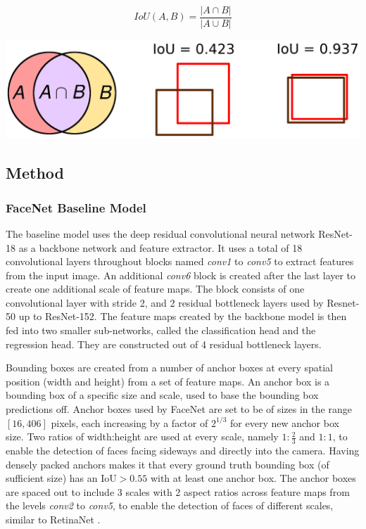 \documentclass[paperwidth=48in,paperheight=48in, fontscale=0.4166666666666, landscape]{baposter}
\begin{document}
\begin{poster}
{\begin{equation}\label{eqiou}
IoU(A, B)=\frac{|A \cap B|}{|A \cup B|}
\end{equation}


\begin{center}
   \includegraphics[scale=0.7]{iou.png}
    \label{figiou}
\end{center}

\subsection{Method}
\subsubsection{FaceNet Baseline Model}
The baseline model uses the deep residual convolutional neural network ResNet-18 \cite{resnet} as a backbone network and feature extractor. It uses a total of 18 convolutional layers throughout blocks named \textit{conv1} to \textit{conv5} to extract features from the input image. An additional \textit{conv6} block is created after the last layer to create one additional scale of feature maps. The block consists of one convolutional layer with stride 2, and 2 residual bottleneck layers used by Resnet-50 up to ResNet-152. The feature maps created by the backbone model is then fed into two smaller sub-networks, called the classification head and the regression head. They are constructed out of 4 residual bottleneck layers.

Bounding boxes are created from a number of anchor boxes at every spatial position (width and height) from a set of feature maps. An anchor box is a bounding box of a specific size and scale, used to base the bounding box predictions off. Anchor boxes used by FaceNet are set to be of sizes in the range $[16, 406]$ pixels, each increasing by a factor of $2^{1/3}$ for every new anchor box size. Two ratios of width:height are used at every scale, namely $1:\frac{2}{3}$ and $1:1$, to enable the detection of faces facing sideways and directly into the camera. Having densely packed anchors makes it that every ground truth bounding box (of sufficient size) has an IoU$>0.55$ with at least one anchor box. The anchor boxes are spaced out to include 3 scales with 2 aspect ratios across feature maps from the levels \textit{conv2} to \textit{conv5}, to enable the detection of faces of different scales, similar to RetinaNet \cite{retinanet}.

}
\end{poster}
\end{document}
